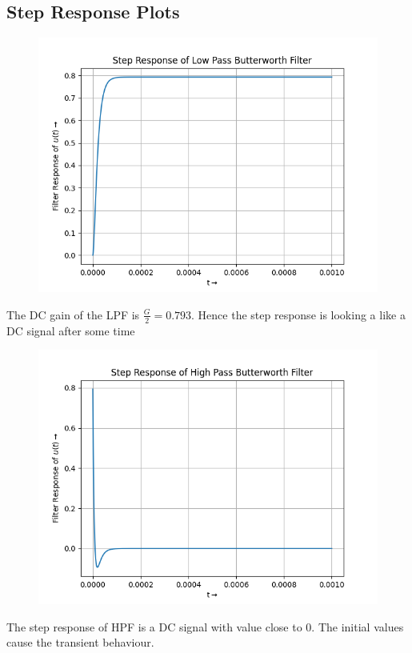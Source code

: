 \documentclass[12pt, a4paper]{article}
\begin{document}
\subsection{Step Response Plots}
\vspace*{-0.5cm}
\begin{figure}[H]
    \centering
    \includegraphics[scale = 0.8]{Figure_2.png}
    \label{fig:sample}
\end{figure}
\begin{center}
    The DC gain of the LPF is $\frac{G}{2} = 0.793$. Hence the step response is looking a like a DC signal after some time
\end{center}
\vspace*{-0.5cm}
\begin{figure}[H]
    \centering
    \includegraphics[scale = 0.8]{Figure_5.png}
    \label{fig:sample}
\end{figure}
\begin{center}
    The step response of HPF is a DC signal with value close to 0. The initial values cause the transient behaviour.
\end{center}
\end{document}
